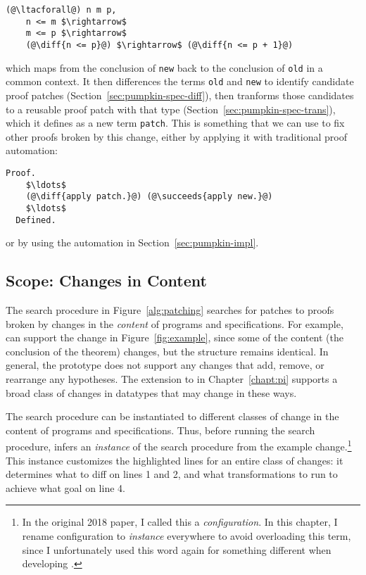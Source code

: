 \begin{lstlisting}[language=coq]
  (@\ltacforall@) n m p,
    n <= m $\rightarrow$
    m <= p $\rightarrow$
    (@\diff{n <= p}@) $\rightarrow$ (@\diff{n <= p + 1}@)
\end{lstlisting}
which maps from the conclusion of \lstinline{new} back to the conclusion of \lstinline{old} in a common context.
It then differences the terms \lstinline{old} and \lstinline{new} to identify candidate proof patches (Section~\ref{sec:pumpkin-spec-diff}),
then tranforms those candidates to a reusable proof patch with that type (Section~\ref{sec:pumpkin-spec-trans}),
which it defines as a new term \lstinline{patch}.
This is something that we can use to fix other proofs broken by this change, either by applying it with traditional proof automation:

\begin{lstlisting}[language=coq]
  Proof.
    $\ldots$
    (@\diff{apply patch.}@) (@\succeeds{apply new.}@)
    $\ldots$
  Defined.
\end{lstlisting}
or by using the automation in Section~\ref{sec:pumpkin-impl}.

\subsection{Scope: Changes in Content}
\label{sec:pumpkin-scope}

The search procedure in Figure~\ref{alg:patching} searches for patches to proofs broken by changes in the \textit{content} of programs and specifications.
For example, \sysname can support the change in Figure~\ref{fig:example}, since some of the content (the conclusion of the theorem) changes,
but the structure remains identical.
In general, the \sysname prototype does not support any changes that add, remove, or rearrange any hypotheses.
The \toolnamec extension to \sysnamelong in Chapter~\ref{chapt:pi} supports a broad class of changes
in datatypes that may change in these ways.

The search procedure can be instantiated to different classes of change in the content of programs and specifications.
Thus, before running the search procedure, \sysname infers an \textit{instance} of the search 
procedure from the example change.\footnote{In the original 2018 \sysnamelong paper, I called this a \textit{configuration}.
In this chapter, I rename configuration to \textit{instance} everywhere to avoid overloading this term,
since I unfortunately used this word again for something different when developing \toolnamec.}
This instance customizes the highlighted lines for an entire class of changes:
it determines what to diff on lines 1 and 2,
and what transformations to run to achieve what goal on line 4.

